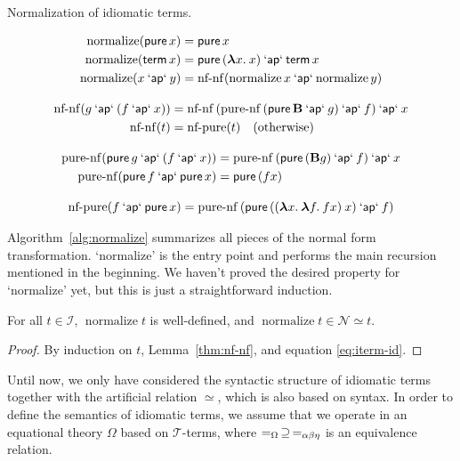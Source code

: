 \begin{algorithm}[t]
\caption{Normalization of idiomatic terms.}
\label{alg:normalize}
\begin{gather*}
	\begin{align*}
		\operatorname{normalize}(\operatorname{\mathsf{pure}} x) &= \operatorname{\mathsf{pure}} x \\
		\operatorname{normalize}(\operatorname{\mathsf{term}} x) &= \operatorname{\mathsf{pure}}{({\boldsymbol\lambda} x.\>x)} \mathbin{\mathsf{`ap`}} \operatorname{\mathsf{term}} x \\
		\operatorname{normalize}(x \mathbin{\mathsf{`ap`}} y) &=
			\operatorname{nf-nf}(\operatorname{normalize} x \mathbin{\mathsf{`ap`}} \operatorname{normalize} y)
	\end{align*} \\[2ex]
	\begin{align*}
		\operatorname{nf-nf}(g \mathbin{\mathsf{`ap`}} (f \mathbin{\mathsf{`ap`}} x)) &=
			\operatorname{nf-nf}{(\operatorname{pure-nf}{(\operatorname{\mathsf{pure}} \mathbf{B} \mathbin{\mathsf{`ap`}} g)} \mathbin{\mathsf{`ap`}} f)} \mathbin{\mathsf{`ap`}} x \\
		\operatorname{nf-nf}(t) &= \operatorname{nf-pure}(t) \quad\text{(otherwise)}
	\end{align*} \\[2ex]
	\begin{align*}
		\operatorname{pure-nf}(\operatorname{\mathsf{pure}} g \mathbin{\mathsf{`ap`}} (f \mathbin{\mathsf{`ap`}} x)) &=
			\operatorname{pure-nf}{(\operatorname{\mathsf{pure}}{(\mathbf{B} g)} \mathbin{\mathsf{`ap`}} f)} \mathbin{\mathsf{`ap`}} x \\
		\operatorname{pure-nf}(\operatorname{\mathsf{pure}} f \mathbin{\mathsf{`ap`}} \operatorname{\mathsf{pure}} x) &= \operatorname{\mathsf{pure}}{(f x)}
	\end{align*} \\[2ex]
	\operatorname{nf-pure}(f \mathbin{\mathsf{`ap`}} \operatorname{\mathsf{pure}} x) =
		\operatorname{pure-nf}{(\operatorname{\mathsf{pure}}{(({\boldsymbol\lambda} x.\>{\boldsymbol\lambda} f.\>f x) \> x)} \mathbin{\mathsf{`ap`}} f)}
\end{gather*}
\end{algorithm}

Algorithm~\ref{alg:normalize} summarizes all pieces of the normal form
transformation.
`normalize' is the entry point and performs the main recursion mentioned in the
beginning.
We haven't proved the desired property for `normalize' yet, but this is just a
straightforward induction.

\begin{lemma}\label{thm:normalize}
For all $t \in \mathcal{I}$, $\operatorname{normalize} t$ is well-defined, and
$\operatorname{normalize} t \in \mathcal{N} \simeq t$.
\end{lemma}
\begin{proof}
By induction on $t$, Lemma~\ref{thm:nf-nf}, and equation \eqref{eq:iterm-id}.
\end{proof}

Until now, we only have considered the syntactic structure of idiomatic terms
together with the artificial relation $\simeq$, which is also based on syntax.
In order to define the semantics of idiomatic terms, we assume that we operate
in an equational theory $\Omega$ based on $\mathcal{T}$-terms, where
$=_\Omega\,\supseteq\,=_{\alpha\beta\eta}$ is an equivalence relation.

